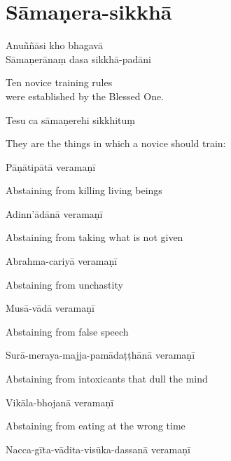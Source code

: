 \section{Sāmaṇera-sikkhā}


Anuññāsi kho bhagavā\\
Sāmaṇerānaṃ dasa sikkhā-padāni

\begin{english}
  Ten novice training rules\\
  were established by the Blessed One.
\end{english}

Tesu ca sāmaṇerehi sikkhituṃ

\begin{english}
  They are the things in which a novice should train:
\end{english}

Pāṇātipātā veramaṇī

\begin{english}
  Abstaining from killing living beings
\end{english}

Adinn'ādānā veramaṇī

\begin{english}
  Abstaining from taking what is not given
\end{english}

Abrahma-cariyā veramaṇī

\begin{english}
  Abstaining from unchastity
\end{english}

Musā-vādā veramaṇī

\begin{english}
  Abstaining from false speech
\end{english}

Surā-meraya-majja-pamādaṭṭhānā veramaṇī

\begin{english}
  Abstaining from intoxicants that dull the mind
\end{english}

Vikāla-bhojanā veramaṇī

\begin{english}
  Abstaining from eating at the wrong time
\end{english}

Nacca-gīta-vādita-visūka-dassanā veramaṇī

